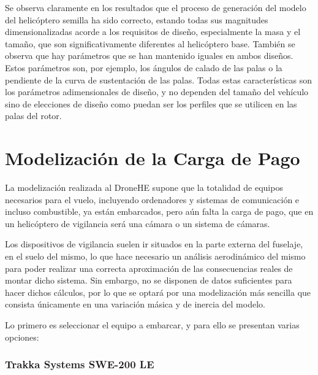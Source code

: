 Se observa claramente en los resultados que el proceso de generación del modelo del helicóptero semilla ha sido correcto, estando todas sus magnitudes dimensionalizadas acorde a los requisitos de diseño, especialmente la masa y el tamaño, que son significativamente diferentes al helicóptero base.
También se observa que hay parámetros que se han mantenido iguales en ambos diseños. Estos parámetros son, por ejemplo, los ángulos de calado de las palas o la pendiente de la curva de sustentación de las palas. Todas estas características son los parámetros adimensionales de diseño, y no dependen del tamaño del vehículo sino de elecciones de diseño como puedan ser los perfiles que se utilicen en las palas del rotor.

\section{Modelización de la Carga de Pago}

La modelización realizada al DroneHE supone que la totalidad de equipos necesarios para el vuelo, incluyendo ordenadores y sistemas de comunicación e incluso combustible, ya están embarcados, pero aún falta la carga de pago, que en un helicóptero de vigilancia será una cámara o un sistema de cámaras.

Los dispositivos de vigilancia suelen ir situados en la parte externa del fuselaje, en el suelo del mismo, lo que hace necesario un análisis aerodinámico del mismo para poder realizar una correcta aproximación de las consecuencias reales de montar dicho sistema. Sin embargo, no se disponen de datos suficientes para hacer dichos cálculos, por lo que se optará por una modelización más sencilla que consista únicamente en una variación másica y de inercia del modelo. 

Lo primero es seleccionar el equipo a embarcar, y para ello se presentan varias opciones:

\subsubsection*{Trakka Systems SWE-200 LE}

